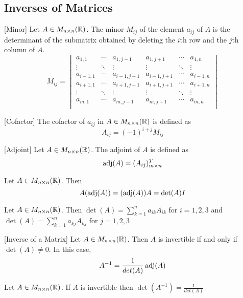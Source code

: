 \documentclass[a4paper]{article}
\begin{document}
\subsection{Inverses of Matrices}
\begin{defn}{}{}[Minor] Let $A\in M_{n\times n}(\mathbb{R})$. The minor $M_{ij}$ of the element $a_{ij}$ of $A$ is the determinant of the submatrix obtained by deleting the $i$th row and the $j$th column of $A$. $$M_{ij}=
\begin{vmatrix}
a_{1,1} & \cdots & a_{1,j-1} & a_{1,j+1} & \cdots & a_{1,n}\\
\vdots & \ddots & \vdots & \vdots & \ddots & \vdots\\
a_{i-1,1} & \cdots & a_{i-1,j-1} & a_{i-1,j+1} & \cdots & a_{i-1,n}\\
a_{i+1,1} & \cdots & a_{i+1,j-1} & a_{i+1,j+1} & \cdots & a_{i+1,n}\\
\vdots & \ddots & \vdots & \vdots & \ddots & \vdots\\
a_{m,1} & \cdots & a_{m,j-1} & a_{m,j+1} & \cdots & a_{m,n}\\
\end{vmatrix}$$
\end{defn}

\begin{defn}{}{}[Cofactor] The cofactor of $a_{ij}$ in $A\in M_{n\times n}(\mathbb{R})$ is defined as $$A_{ij}=(-1)^{i+j}M_{ij}$$
\end{defn}

\begin{defn}{}{}[Adjoint] Let $A\in M_{n\times n}(\mathbb{R})$. The adjoint of $A$ is defined as $$\operatorname{adj}(A)=(A_{ij})_{m\times n}^T$$
\end{defn}

\begin{thm}{}{} Let $A\in M_{n\times n}(\mathbb{R})$. Then $$A(\operatorname{adj}(A))=(\operatorname{adj}(A))A=\det(A)I$$
\end{thm}

\begin{prp}{}{} Let $A\in M_{n\times n}(\mathbb{R})$. Then $\det(A)=\sum_{k=1}^{n}a_{ik}A_{ik}$ for $i=1,2,3$ and $\det(A)=\sum_{k=1}^{n}a_{kj}A_{kj}$ for $j=1,2,3$
\end{prp}

\begin{thm}{}{}[Inverse of a Matrix] Let $A\in M_{n\times n}(\mathbb{R})$. Then $A$ is invertible if and only if $\det(A)\neq0$. In this case, $$A^{-1}=\frac{1}{det(A)}\operatorname{adj}(A)$$
\end{thm}

\begin{prp}{}{} Let $A\in M_{n\times n}(\mathbb{R})$. If $A$ is invertible then $\det(A^{-1})=\frac{1}{det(A)}$
\end{prp}
\end{document}
